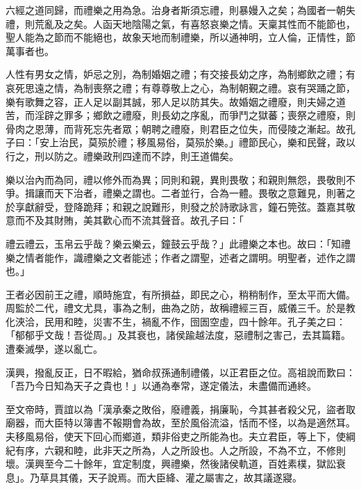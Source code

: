 
\begin{pinyinscope}
六經之道同歸，而禮樂之用為急。治身者斯須忘禮，則暴嫚入之矣；為國者一朝失禮，則荒亂及之矣。人函天地陰陽之氣，有喜怒哀樂之情。天稟其性而不能節也，聖人能為之節而不能絕也，故象天地而制禮樂，所以通神明，立人倫，正情性，節萬事者也。

人性有男女之情，妒忌之別，為制婚姻之禮；有交接長幼之序，為制鄉飲之禮；有哀死思遠之情，為制喪祭之禮；有尊尊敬上之心，為制朝覲之禮。哀有哭踊之節，樂有歌舞之容，正人足以副其誠，邪人足以防其失。故婚姻之禮廢，則夫婦之道苦，而淫辟之罪多；鄉飲之禮廢，則長幼之序亂，而爭鬥之獄蕃；喪祭之禮廢，則骨肉之恩薄，而背死忘先者眾；朝聘之禮廢，則君臣之位失，而侵陵之漸起。故孔子曰：「安上治民，莫殒於禮；移風易俗，莫殒於樂。」禮節民心，樂和民聲，政以行之，刑以防之。禮樂政刑四達而不誖，則王道備矣。

樂以治內而為同，禮以修外而為異；同則和親，異則畏敬；和親則無怨，畏敬則不爭。揖讓而天下治者，禮樂之謂也。二者並行，合為一體。畏敬之意難見，則著之於享獻辭受，登降跪拜；和親之說難形，則發之於詩歌詠言，鐘石筦弦。蓋嘉其敬意而不及其財賄，美其歡心而不流其聲音。故孔子曰：「

禮云禮云，玉帛云乎哉？樂云樂云，鐘鼓云乎哉？」此禮樂之本也。故曰：「知禮樂之情者能作，識禮樂之文者能述；作者之謂聖，述者之謂明。明聖者，述作之謂也。」

王者必因前王之禮，順時施宜，有所損益，即民之心，稍稍制作，至太平而大備。周監於二代，禮文尤具，事為之制，曲為之防，故稱禮經三百，威儀三千。於是教化浹洽，民用和睦，災害不生，禍亂不作，囹圄空虛，四十餘年。孔子美之曰：「郁郁乎文哉！吾從周。」及其衰也，諸侯踰越法度，惡禮制之害己，去其篇籍。遭秦滅學，遂以亂亡。

漢興，撥亂反正，日不暇給，猶命叔孫通制禮儀，以正君臣之位。高祖說而歎曰：「吾乃今日知為天子之貴也！」以通為奉常，遂定儀法，未盡備而通終。

至文帝時，賈誼以為「漢承秦之敗俗，廢禮義，捐廉恥，今其甚者殺父兄，盜者取廟器，而大臣特以簿書不報期會為故，至於風俗流溢，恬而不怪，以為是適然耳。夫移風易俗，使天下回心而鄉道，類非俗吏之所能為也。夫立君臣，等上下，使綱紀有序，六親和睦，此非天之所為，人之所設也。人之所設，不為不立，不修則壞。漢興至今二十餘年，宜定制度，興禮樂，然後諸侯軌道，百姓素樸，獄訟衰息」。乃草具其儀，天子說焉。而大臣絳、灌之屬害之，故其議遂寢。


\end{pinyinscope}
